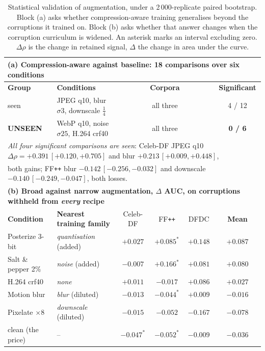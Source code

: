 \documentclass[journal,onecolumn]{IEEEtran}
\newcommand{\celebdf}{Celeb-DF}
\newcommand{\ffpp}{FF\texttt{++}}
\newcommand{\dfdc}{DFDC}
\newcommand{\best}[1]{\textbf{#1}}
\begin{document}
\begin{table}[!ht]
\centering
\caption{Statistical validation of augmentation, under a 2\,000-replicate paired
bootstrap. Block (a) asks whether compression-aware training generalises beyond
the corruptions it trained on. Block (b) asks whether that answer changes when
the corruption curriculum is widened. An asterisk marks an interval excluding
zero. $\Delta\rho$ is the change in retained signal, $\Delta$ the change in area
under the curve.}
\label{tab:stats}
\footnotesize
\setlength{\tabcolsep}{4.5pt}
\begin{tabular}{llcccc}
\toprule
\multicolumn{6}{l}{\textbf{(a) Compression-aware against baseline: 18 comparisons over six conditions}} \\
\midrule
\textbf{Group} & \textbf{Conditions} & \multicolumn{3}{c}{\textbf{Corpora}} & \textbf{Significant} \\
\midrule
seen   & JPEG q10, blur $\sigma3$, downscale $\tfrac14$ & \multicolumn{3}{c}{all three} & 4 / 12 \\
\textbf{UNSEEN} & WebP q10, noise $\sigma25$, H.264 crf40 & \multicolumn{3}{c}{all three} & \best{0 / 6} \\
\midrule
\multicolumn{6}{l}{\emph{All four significant comparisons are seen}: \celebdf{} JPEG q10 $\Delta\rho = +0.391\,[+0.120,+0.705]$ and blur $+0.213\,[+0.009,+0.448]$,} \\
\multicolumn{6}{l}{both gains; \ffpp{} blur $-0.142\,[-0.256,-0.032]$ and downscale $-0.140\,[-0.249,-0.047]$, both losses.} \\
\midrule
\multicolumn{6}{l}{\textbf{(b) Broad against narrow augmentation, $\Delta$ AUC, on corruptions withheld from \emph{every} recipe}} \\
\midrule
\textbf{Condition} & \textbf{Nearest training family} & \celebdf{} & \ffpp{} & \dfdc{} & \textbf{Mean} \\
\midrule
Posterize 3-bit    & \emph{quantisation} (added)   & $+0.027$ & $\mathbf{+0.085}^{*}$ & $+0.148$ & \best{$+0.087$} \\
Salt \& pepper 2\% & \emph{noise} (added)          & $-0.007$ & $\mathbf{+0.166}^{*}$ & $+0.081$ & \best{$+0.080$} \\
H.264 crf40        & \emph{none}                   & $+0.011$ & $-0.017$ & $+0.086$ & $+0.027$ \\
Motion blur        & \emph{blur} (diluted)         & $-0.013$ & $\mathbf{-0.044}^{*}$ & $+0.009$ & $-0.016$ \\
Pixelate $\times8$ & \emph{downscale} (diluted)    & $-0.015$ & $-0.052$ & $-0.167$ & \best{$-0.078$} \\
\midrule
clean (the price)  & --                            & $\mathbf{-0.047}^{*}$ & $\mathbf{-0.052}^{*}$ & $-0.009$ & $-0.036$ \\
\bottomrule
\end{tabular}


\end{table}
\end{document}
